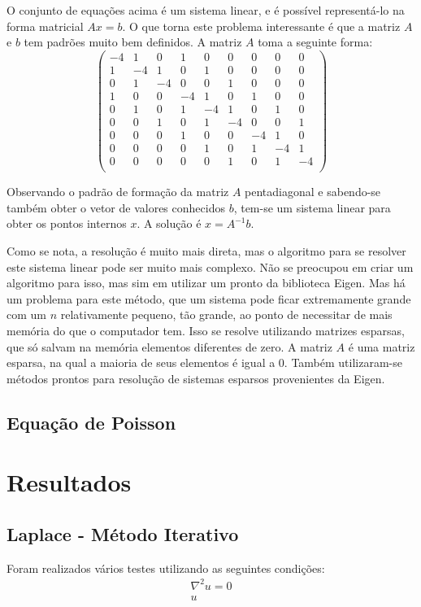 \documentclass[journal]{IEEEtran}
\begin{document}
O conjunto de equações acima é um sistema linear, e é possível representá-lo na forma matricial $Ax = b$. O que torna este problema interessante é que a matriz $A$ e $b$ tem padrões muito bem definidos. A matriz $A$ toma a seguinte forma:
\[ \left( \begin{array}{ccccccccc}
-4 & 1 & 0 & 1 & 0 & 0 & 0 & 0 & 0 \\ %
1 & -4 & 1 & 0 & 1 & 0 & 0 & 0 & 0 \\ %
0 & 1 & -4 & 0 & 0 & 1 & 0 & 0 & 0 \\ %
1 & 0 & 0 & -4 & 1 & 0 & 1 & 0 & 0 \\ %
0 & 1 & 0 & 1 & -4 & 1 & 0 & 1 & 0 \\ %
0 & 0 & 1 & 0 & 1 & -4 & 0 & 0 & 1 \\ %
0 & 0 & 0 & 1 & 0 & 0 & -4 & 1 & 0 \\ %
0 & 0 & 0 & 0 & 1 & 0 & 1 & -4 & 1 \\ %
0 & 0 & 0 & 0 & 0 & 1 & 0 & 1 & -4 \\ %
\end{array} \right)\]

Observando o padrão de formação da matriz $A$ pentadiagonal e sabendo-se também obter o vetor de valores conhecidos $b$, tem-se um sistema linear para obter os pontos internos $x$. A solução é $x=A^{-1}b$.

Como se nota, a resolução é muito mais direta, mas o algoritmo para se resolver este sistema linear pode ser muito mais complexo. Não se preocupou em criar um algoritmo para isso, mas sim em utilizar um pronto da biblioteca Eigen. Mas há um problema para este método, que um sistema pode ficar extremamente grande com um $n$ relativamente pequeno, tão grande, ao ponto de necessitar de mais memória do que o computador tem. Isso se resolve utilizando matrizes esparsas, que só salvam na memória elementos diferentes de zero. A matriz $A$ é uma matriz esparsa, na qual a maioria de seus elementos é igual a 0. Também utilizaram-se métodos prontos para resolução de sistemas esparsos provenientes da Eigen.
\subsection{Equação de Poisson}


\section{Resultados}
\subsection{Laplace - Método Iterativo}
Foram realizados vários testes utilizando as seguintes condições:
\begin{eqnarray}
\nabla^2 u=0\\
u_{}
\end{eqnarray}
\newpage
\end{document}
